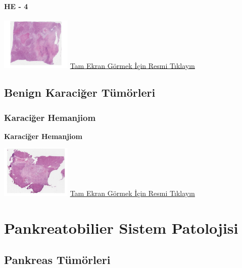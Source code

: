 \documentclass[
  letterpaper,
  DIV=11,
  numbers=noendperiod]{scrreprt}
\begin{document}
\hypertarget{he---4-1}{%
\subsection{HE - 4}\label{he---4-1}}

\href{https://images.patolojiatlasi.com/fibrolamellar-hepatocellular-carcinoma/HE4.html}{\includegraphics[width=0.25\textwidth,height=\textheight]{./screenshots/fibrolamellar-hepatocellular-carcinoma-4_screenshot.png}}
\href{https://images.patolojiatlasi.com/fibrolamellar-hepatocellular-carcinoma/HE4.html}{Tam
Ekran Görmek İçin Resmi Tıklayın}

\hypertarget{sec-benign-karaciger-tumorleri}{%
\chapter{Benign Karaciğer
Tümörleri}\label{sec-benign-karaciger-tumorleri}}

\hypertarget{sec-karaciger-hemanjiom}{%
\section{Karaciğer Hemanjiom}\label{sec-karaciger-hemanjiom}}

\textbf{Karaciğer Hemanjiom}

\href{https://images.patolojiatlasi.com/liver-hemangioma/HE.html}{\includegraphics[width=0.25\textwidth,height=\textheight]{./screenshots/liver-hemangioma_screenshot.png}}
\href{https://images.patolojiatlasi.com/liver-hemangioma/HE.html}{Tam
Ekran Görmek İçin Resmi Tıklayın}

\part{Pankreatobilier Sistem Patolojisi}

\hypertarget{sec-pankreas-tumorleri}{%
\chapter{Pankreas Tümörleri}\label{sec-pankreas-tumorleri}}
\end{document}
